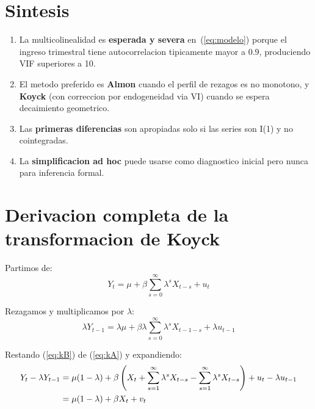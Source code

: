 \documentclass[12pt, letterpaper]{article}
\theoremstyle{remark}
\begin{document}
\section{Sintesis}

\begin{enumerate}[leftmargin=1.8em, itemsep=6pt]
  \item La multicolinealidad es \textbf{esperada y severa} en~(\ref{eq:modelo})
    porque el ingreso trimestral tiene autocorrelacion tipicamente mayor a
    $0.9$, produciendo VIF superiores a 10.

  \item El metodo preferido es \textbf{Almon} cuando el perfil de rezagos es
    no monotono, y \textbf{Koyck} (con correccion por endogeneidad via VI)
    cuando se espera decaimiento geometrico.

  \item Las \textbf{primeras diferencias} son apropiadas solo si las series
    son I(1) y no cointegradas.

  \item La \textbf{simplificacion ad hoc} puede usarse como diagnostico
    inicial pero nunca para inferencia formal.
\end{enumerate}

\appendix

\section{Derivacion completa de la transformacion de Koyck}

Partimos de:
\begin{equation}
  Y_t = \mu + \beta\sum_{s=0}^{\infty}\lambda^s X_{t-s} + u_t
  \label{eq:kA}
\end{equation}

Rezagamos y multiplicamos por $\lambda$:
\begin{equation}
  \lambda Y_{t-1} = \lambda\mu + \beta\lambda\sum_{s=0}^{\infty}\lambda^s X_{t-1-s} + \lambda u_{t-1}
  \label{eq:kB}
\end{equation}

Restando (\ref{eq:kB}) de (\ref{eq:kA}) y expandiendo:
\begin{align}
  Y_t - \lambda Y_{t-1}
  &= \mu(1-\lambda) + \beta\left(X_t
     + \sum_{s=1}^{\infty}\lambda^s X_{t-s}
     - \sum_{s=1}^{\infty}\lambda^s X_{t-s}\right)
     + u_t - \lambda u_{t-1} \notag\\
  &= \mu(1-\lambda) + \beta X_t + v_t
\end{align}
\end{document}
